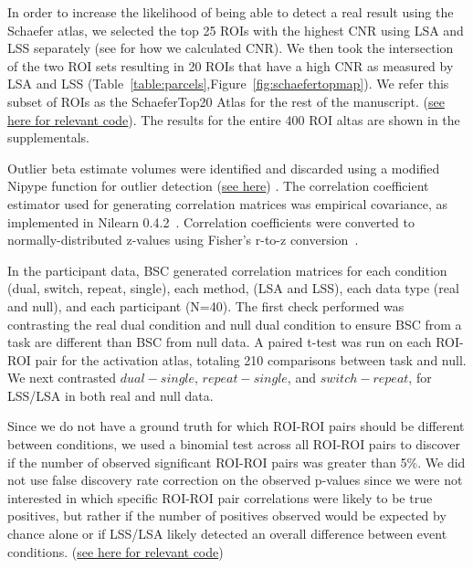 \documentclass[phd,appendix,figures]{uithesis}
\begin{document}
In order to increase the likelihood of being able to detect a real result using the Schaefer atlas,
we selected the top 25 ROIs with the highest CNR using LSA and LSS separately
(see  for how we calculated CNR).
We then took the intersection of the two ROI sets resulting in 20 ROIs that have a high CNR
as measured by LSA and LSS (Table~\ref{table:parcels},Figure~\ref{fig:schaefertopmap}).
We refer this subset of ROIs as the SchaeferTop20 Atlas for the rest of the manuscript.
(\href{https://github.com/jdkent/BetaSeriesRealDataAnalysis/blob/b18b44321edf7b662a1e5ea635f64452c8d3644c/nibsAnalysis/cnr_trial_variability.ipynb}{see here for relevant code}).
The results for the entire 400 ROI altas are shown in the supplementals.

Outlier beta estimate volumes were identified and discarded using a
modified Nipype function for outlier detection
(\href{https://github.com/HBClab/NiBetaSeries/blob/a45c0a1f/src/nibetaseries/interfaces/nilearn.py#L153}{see here}) \cite{Crosby1994}.
The correlation coefficient estimator used for generating correlation matrices
was empirical covariance, as implemented in Nilearn 0.4.2~\cite{Abraham2014}.
Correlation coefficients were converted to normally-distributed z-values using
Fisher's r-to-z conversion~\cite{Fisher1915}.

In the participant data, BSC generated correlation matrices for each condition (dual, switch, repeat, single),
each method, (LSA and LSS), each data type (real and null), and each participant (N=40).
The first check performed was contrasting the real dual condition and null dual condition
to ensure BSC from a task are different than BSC from null data.
A paired t-test was run on each ROI-ROI pair for the activation atlas, totaling 210 comparisons
between task and null.
We next contrasted $dual - single$, $repeat - single$, and $switch - repeat$, for LSS/LSA in both
real and null data.

Since we do not have a ground truth for which ROI-ROI pairs should be different between conditions,
we used a binomial test across all ROI-ROI pairs to discover if the number of observed significant ROI-ROI pairs was greater
than 5\%.
We did not use false discovery rate correction on the observed p-values since we were not interested in
which specific ROI-ROI pair correlations were likely to be true positives, but rather if the number of positives
observed would be expected by chance alone or if LSS/LSA likely detected an overall difference between event conditions.
(\href{https://github.com/jdkent/BetaSeriesRealDataAnalysis/blob/b18b44321edf7b662a1e5ea635f64452c8d3644c/nibsAnalysis/beta_series_analysis.ipynb}{see here for relevant code})
\end{document}
